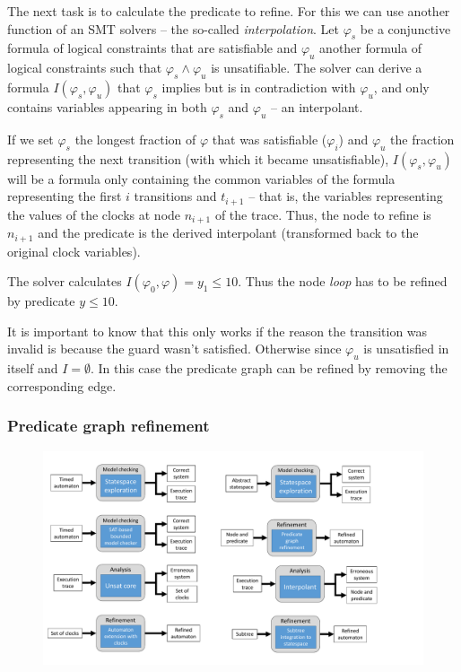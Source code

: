 The next task is to calculate the predicate to refine. For this we can use another function of an SMT solvers -- the so-called \emph{interpolation}.
Let $\varphi_s$ be a conjunctive formula of logical constraints that are satisfiable and $\varphi_u$ another formula of logical constraints such that  $\varphi_s \wedge \varphi_u$ is unsatifiable. The solver can derive a formula $I(\varphi_s, \varphi_u)$ that $\varphi_s$ implies but is in contradiction with $\varphi_u$, and only contains variables appearing in both $\varphi_s$  and $\varphi_u$ -- an interpolant.

If we set $\varphi_s$ the longest fraction of $\varphi$ that was satisfiable ($\varphi_i$) and $\varphi_u$ the fraction representing the next transition (with which it became unsatisfiable), $I(\varphi_s, \varphi_u)$ will be a formula only containing the common variables of the formula representing the first $i$ transitions and $t_{i+1}$ -- that is, the variables representing the values of the clocks at node $n_{i+1}$ of the trace. Thus, the node to refine is $n_{i+1}$ and the predicate is the derived interpolant (transformed back to the original clock variables).

\begin{runningExample}
	The solver calculates $I(\varphi_0,\varphi)= y_1 \leq 10$. Thus the node \emph{loop} has to be refined by predicate $y \leq 10$.
\end{runningExample}

It is important to know that this only works if the reason the transition was invalid is because the guard wasn't satisfied. Otherwise since $\varphi_u$ is unsatisfied in itself and $I= \emptyset$. In this case the predicate graph can be refined by removing the corresponding edge.

\subsubsection{Predicate graph refinement}

\begin{figure}[h]
	\centering
	\includegraphics[width=.7\textwidth]{include/figures/pred_modules_ref}
\end{figure}

